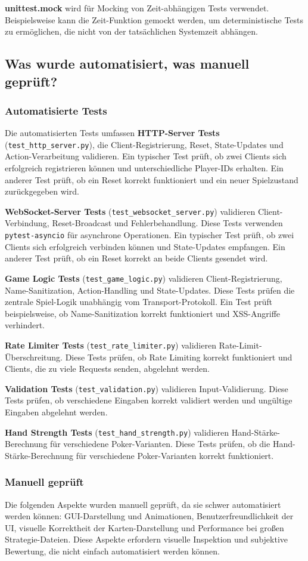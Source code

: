 \textbf{unittest.mock} wird für Mocking von Zeit-abhängigen Tests verwendet.
Beispielsweise kann die Zeit-Funktion gemockt werden, um deterministische Tests zu ermöglichen, die nicht von der tatsächlichen Systemzeit abhängen.

\subsection{Was wurde automatisiert, was manuell geprüft?}

\subsubsection{Automatisierte Tests}

Die automatisierten Tests umfassen \textbf{HTTP-Server Tests} (\texttt{test\_http\_server.py}), die Client-Registrierung, Reset, State-Updates und Action-Verarbeitung validieren.
Ein typischer Test prüft, ob zwei Clients sich erfolgreich registrieren können und unterschiedliche Player-IDs erhalten.
Ein anderer Test prüft, ob ein Reset korrekt funktioniert und ein neuer Spielzustand zurückgegeben wird.

\textbf{WebSocket-Server Tests} (\texttt{test\_websocket\_server.py}) validieren Client-Verbindung, Reset-Broadcast und Fehlerbehandlung.
Diese Tests verwenden \texttt{pytest-asyncio} für asynchrone Operationen.
Ein typischer Test prüft, ob zwei Clients sich erfolgreich verbinden können und State-Updates empfangen.
Ein anderer Test prüft, ob ein Reset korrekt an beide Clients gesendet wird.

\textbf{Game Logic Tests} (\texttt{test\_game\_logic.py}) validieren Client-Registrierung, Name-Sanitization, Action-Handling und State-Updates.
Diese Tests prüfen die zentrale Spiel-Logik unabhängig vom Transport-Protokoll.
Ein Test prüft beispielsweise, ob Name-Sanitization korrekt funktioniert und XSS-Angriffe verhindert.

\textbf{Rate Limiter Tests} (\texttt{test\_rate\_limiter.py}) validieren Rate-Limit-Überschreitung.
Diese Tests prüfen, ob Rate Limiting korrekt funktioniert und Clients, die zu viele Requests senden, abgelehnt werden.

\textbf{Validation Tests} (\texttt{test\_validation.py}) validieren Input-Validierung.
Diese Tests prüfen, ob verschiedene Eingaben korrekt validiert werden und ungültige Eingaben abgelehnt werden.

\textbf{Hand Strength Tests} (\texttt{test\_hand\_strength.py}) validieren Hand-Stärke-Berechnung für verschiedene Poker-Varianten.
Diese Tests prüfen, ob die Hand-Stärke-Berechnung für verschiedene Poker-Varianten korrekt funktioniert.

\subsubsection{Manuell geprüft}

Die folgenden Aspekte wurden manuell geprüft, da sie schwer automatisiert werden können: GUI-Darstellung und Animationen, Benutzerfreundlichkeit der UI, visuelle Korrektheit der Karten-Darstellung und Performance bei großen Strategie-Dateien.
Diese Aspekte erfordern visuelle Inspektion und subjektive Bewertung, die nicht einfach automatisiert werden können.
